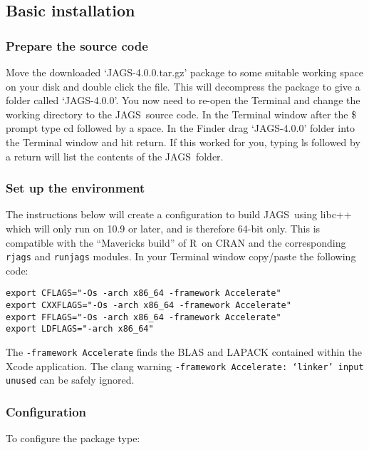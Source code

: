 \documentclass[11pt, a4paper, titlepage]{article}
\newcommand{\release}{4.0.0}
\newcommand{\JAGS}{\textsf{JAGS}}
\newcommand{\R}{\textsf{R}}
\newcommand{\code}[1]{{\bgroup{\normalfont\ttfamily #1}\egroup}}
\newcommand{\file}[1]{{`\normalfont\textsf{#1}'}}
\begin{document}
\subsection{Basic installation}


\subsubsection{Prepare the source code}

Move the downloaded \file{JAGS-\release.tar.gz} package to some suitable
working space on your disk and double click the file.  This will
decompress the package to give a folder called \file{JAGS-\release}.  
You now need to re-open the Terminal and
change the working directory to the \JAGS\ source code. In the Terminal
window after the \$ prompt type \code{cd} followed by a space.  In the Finder
drag \file{JAGS-\release} folder into the Terminal window and hit return.  If this
worked for you, typing \code{ls} followed by a return will list the contents
of the \JAGS\ folder.


\subsubsection{Set up the environment}
\label{section:osxenvironment}

The instructions below will create a configuration to build \JAGS\ using 
libc++ which will only run on 10.9 or later, and is therefore 64-bit only.
This is compatible with the ``Mavericks build'' of \R\ on CRAN and the 
corresponding \texttt{rjags} and \texttt{runjags} modules.  
In your Terminal window copy/paste the following code:

\begin{verbatim}
export CFLAGS="-Os -arch x86_64 -framework Accelerate"
export CXXFLAGS="-Os -arch x86_64 -framework Accelerate"
export FFLAGS="-Os -arch x86_64 -framework Accelerate"
export LDFLAGS="-arch x86_64"
\end{verbatim}

The \texttt{-framework Accelerate} finds the BLAS and LAPACK 
contained within the Xcode application.  The clang warning
\texttt{-framework Accelerate: `linker' input unused} can
be safely ignored.

\subsubsection{Configuration}

To configure the package type:
\end{document}
